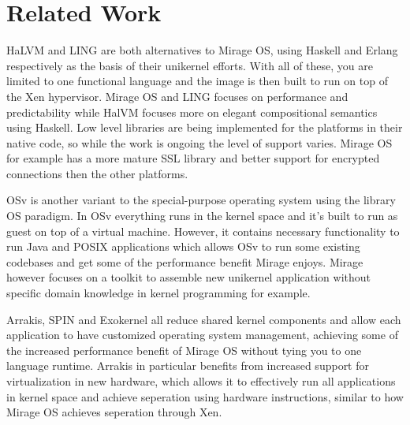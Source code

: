 \documentclass[english,10pt,twocolumn]{article}
\begin{document}
\section{Related Work}

HaLVM\cite{halvm} and LING\cite{ling} are both alternatives to Mirage OS, using Haskell and Erlang respectively as the basis of their unikernel efforts. With all of these, you are limited to one functional language and the image is then built to run on top of the Xen hypervisor. Mirage OS and LING focuses on performance and predictability while HalVM focuses more on elegant compositional semantics using Haskell. Low level libraries are being implemented for the platforms in their native code, so while the work is ongoing the level of support varies. Mirage OS for example has a more mature SSL library and better support for encrypted connections then the other platforms.

OSv\cite{osv} is another variant to the special-purpose operating system using the library OS paradigm. In OSv everything runs in the kernel space and it's built to run as guest on top of a virtual machine. However, it contains necessary functionality to run Java and POSIX applications which allows OSv to run some existing codebases and get some of the performance benefit Mirage enjoys. Mirage however focuses on a toolkit to assemble new unikernel application without specific domain knowledge in kernel programming for example.

Arrakis\cite{arrakis}, SPIN\cite{spin} and Exokernel\cite{exokernel} all reduce shared kernel components and allow each application to have customized operating system management, achieving some of the increased performance benefit of Mirage OS without tying you to one language runtime.  Arrakis in particular benefits from increased support for virtualization in new hardware, which allows it to effectively run all applications in kernel space and achieve seperation using hardware instructions, similar to how Mirage OS achieves seperation through Xen.




\end{document}
